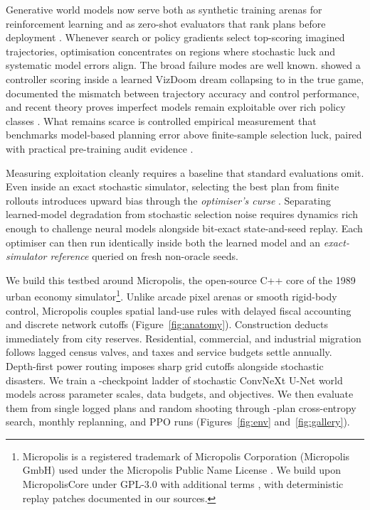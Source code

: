 Generative world models now serve both as synthetic training arenas for reinforcement learning \citep{hafner2025dreamerv3,alonso2024diamond,hafner2025dreamer4,chen2025dreamgym} and as zero-shot evaluators that rank plans before deployment \citep{quevedo2025worldgym,guo2026ctrlworld,geminirobotics2025veo}. Whenever search or policy gradients select top-scoring imagined trajectories, optimisation concentrates on regions where stochastic luck and systematic model errors align. The broad failure modes are well known. \citet{ha2018worldmodels} showed a controller scoring \HaDream{} inside a learned VizDoom dream collapsing to \HaGame{} in the true game, \citet{lambert2020objective} documented the mismatch between trajectory accuracy and control performance, and recent theory proves imperfect models remain exploitable over rich policy classes \citep{bhamidipaty2026exploitable}. What remains scarce is controlled empirical measurement that benchmarks model-based planning error above finite-sample selection luck, paired with practical pre-training audit evidence \citep{yu2026worldmodelseval}.

Measuring exploitation cleanly requires a baseline that standard evaluations omit. Even inside an exact stochastic simulator, selecting the best plan from finite rollouts introduces upward bias through the \emph{optimiser's curse} \citep{smith2006optimizer}. Separating learned-model degradation from stochastic selection noise requires dynamics rich enough to challenge neural models alongside bit-exact state-and-seed replay. Each optimiser can then run identically inside both the learned model and an \emph{exact-simulator reference} queried on fresh non-oracle seeds.

We build this testbed around Micropolis, the open-source C++ core of the 1989 urban economy simulator\footnote{Micropolis is a registered trademark of Micropolis Corporation (Micropolis GmbH) used under the Micropolis Public Name License \citep{micropolisnamelicense}. We build upon MicropolisCore \citep{micropoliscore} under GPL-3.0 with additional terms \citep{micropolisgpl}, with deterministic replay patches documented in our sources.}. Unlike arcade pixel arenas or smooth rigid-body control, Micropolis couples spatial land-use rules with delayed fiscal accounting and discrete network cutoffs (Figure~\ref{fig:anatomy}). Construction deducts immediately from city reserves. Residential, commercial, and industrial migration follows lagged census valves, and taxes and service budgets settle annually. Depth-first power routing imposes sharp grid cutoffs alongside stochastic disasters. We train a \Ladder-checkpoint ladder of stochastic ConvNeXt U-Net world models across parameter scales, data budgets, and objectives. We then evaluate them from single logged plans and random shooting through -plan cross-entropy search, monthly replanning, and \RlRunsDone{} PPO runs (Figures~\ref{fig:env} and~\ref{fig:gallery}).

